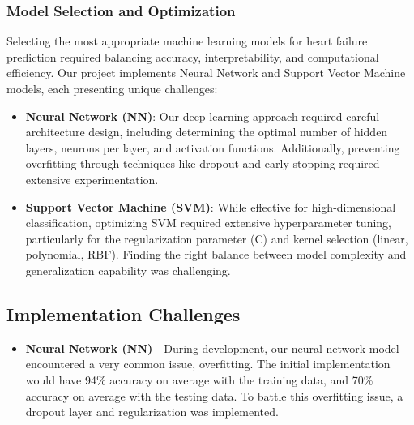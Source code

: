 \documentclass[11pt,a4paper]{article}
\newcommand{\greencheck}{\textcolor{green}{\ding{52}}}
\begin{document}
\subsubsection{Model Selection and Optimization}
\vspace{-0.25cm}
Selecting the most appropriate machine learning models for heart failure prediction required balancing accuracy, interpretability, and computational efficiency. Our project implements Neural Network and Support Vector Machine models, each presenting unique challenges:

\begin{itemize}
    \vspace{-0.25cm}
    \item \textbf{\greencheck \space Neural Network (NN)}: Our deep learning approach required careful architecture design, including determining the optimal number of hidden layers, neurons per layer, and activation functions. Additionally, preventing overfitting through techniques like dropout and early stopping required extensive experimentation.

    \item \textbf{\greencheck \space Support Vector Machine (SVM)}: While effective for high-dimensional classification, optimizing SVM required extensive hyperparameter tuning, particularly for the regularization parameter (C) and kernel selection (linear, polynomial, RBF). Finding the right balance between model complexity and generalization capability was challenging.
\end{itemize}

\subsection{Implementation Challenges}
\begin{itemize}
    \item \textbf{Neural Network (NN)} - During development, our neural network model encountered a very common issue, overfitting. The initial implementation would have 94\% accuracy on average with the training data, and 70\% accuracy on average with the testing data. To battle this overfitting issue, a dropout layer and regularization was implemented.
\end{itemize}

\end{document}
